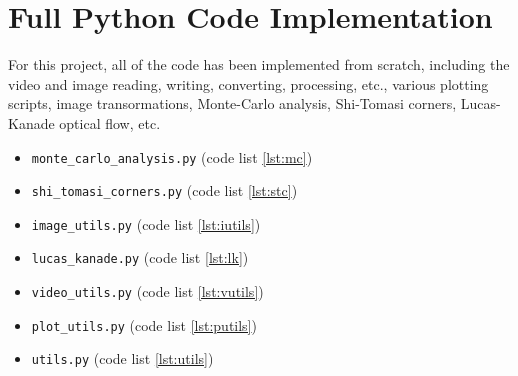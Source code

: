 \documentclass[11pt, conference, letterpaper]{IEEEtran}
\begin{document}
\newpage

\onecolumn
\section{Full Python Code Implementation}
For this project, all of the code has been implemented from scratch, including the video and image reading, writing, converting, processing, etc., various plotting scripts, image transormations, Monte-Carlo analysis, Shi-Tomasi corners, Lucas-Kanade optical flow, etc.

\begin{itemize}
    \item \texttt{monte\_carlo\_analysis.py} (code list \ref{lst:mc})
    \item \texttt{shi\_tomasi\_corners.py} (code list \ref{lst:stc})
    \item \texttt{image\_utils.py} (code list \ref{lst:iutils})
    \item \texttt{lucas\_kanade.py} (code list \ref{lst:lk})
    \item \texttt{video\_utils.py} (code list \ref{lst:vutils})
    \item \texttt{plot\_utils.py} (code list \ref{lst:putils})
    \item \texttt{utils.py} (code list \ref{lst:utils})
\end{itemize}
\end{document}
